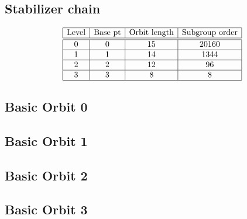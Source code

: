 \subsection*{Stabilizer chain}


$$
\begin{array}{|c|c|c|c|}
\hline
\mbox{Level} & \mbox{Base pt} & \mbox{Orbit length} & \mbox{Subgroup order}\\
\hline
\hline
0 & 0 & 15 & 20160\\
\hline
1 & 1 & 14 & 1344\\
\hline
2 & 2 & 12 & 96\\
\hline
3 & 3 & 8 & 8\\
\hline
\end{array}
$$

\subsection*{Basic Orbit 0}



\bigskip

\subsection*{Basic Orbit 1}



\bigskip

\subsection*{Basic Orbit 2}



\bigskip

\subsection*{Basic Orbit 3}



